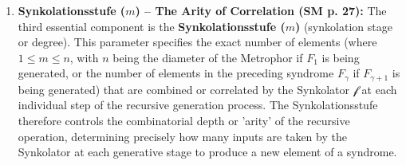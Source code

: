 \documentclass[12pt]{article}
\newcommand{\synkolator}{\mathcal{f}}
\newcommand{\synkolationsstufe}{m}
\newcommand{\syndrom}{F} %
\begin{document}
\begin{enumerate}
    \item \textbf{Synkolationsstufe (\( \synkolationsstufe \)) – The Arity of Correlation (SM p. 27):}
    The third essential component is the \textbf{Synkolationsstufe (\( \synkolationsstufe \))} (synkolation stage or degree). This parameter specifies the exact number of elements (where \( 1 \leq \synkolationsstufe \leq n \), with \( n \) being the diameter of the Metrophor if \( \syndrom_1 \) is being generated, or the number of elements in the preceding syndrome \( \syndrom_\gamma \) if \( \syndrom_{\gamma+1} \) is being generated) that are combined or correlated by the Synkolator \( \synkolator \) at each individual step of the recursive generation process. The Synkolationsstufe therefore controls the combinatorial depth or 'arity' of the recursive operation, determining precisely how many inputs are taken by the Synkolator at each generative stage to produce a new element of a syndrome.
\end{enumerate}
\end{document}
